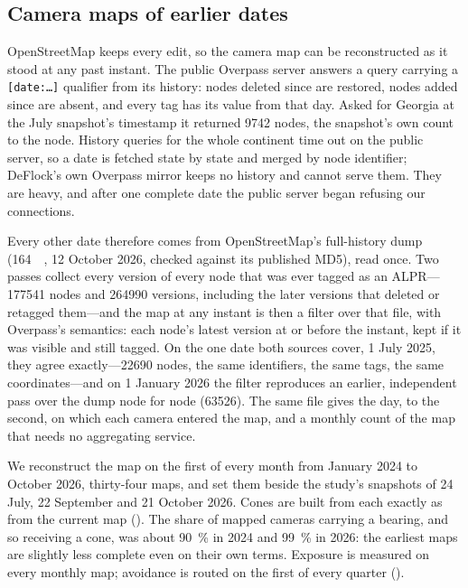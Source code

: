 \documentclass[11pt,twoside]{article}
\newcommand{\alpr}{ALPR\xspace}
\begin{document}
\subsection{Camera maps of earlier dates}
\label{sec:data:history}

OpenStreetMap keeps every edit, so the camera map can be reconstructed as it stood at any
past instant. The public Overpass server answers a query carrying a \texttt{[date:\ldots]}
qualifier from its history: nodes deleted since are restored, nodes added since are absent,
and every tag has its value from that day. Asked for Georgia at the July snapshot's
timestamp it returned \num{9742} nodes, the snapshot's own count to the node. History
queries for the whole continent time out on the public server, so a date is fetched state by
state and merged by node identifier; DeFlock's own Overpass mirror keeps no history and cannot
serve them. They are heavy, and after one complete date the public server began refusing our
connections.

Every other date therefore comes from OpenStreetMap's full-history dump \citep{osmplanet}
(\SI{164}{\giga\byte}, 12 October 2026, checked against its published MD5), read once. Two
passes collect every version of every node that was ever tagged as an \alpr---\num{177541}
nodes and \num{264990} versions, including the later versions that deleted or retagged
them---and the map at any instant is then a filter over that file, with Overpass's semantics:
each node's latest version at or before the instant, kept if it was visible and still tagged.
On the one date both sources cover, 1 July 2025, they agree exactly---\num{22690} nodes, the
same identifiers, the same tags, the same coordinates---and on 1 January 2026 the filter
reproduces an earlier, independent pass over the dump node for node (\num{63526}). The same
file gives the day, to the second, on which each camera entered the map, and a monthly count
of the map that needs no aggregating service.

We reconstruct the map on the first of every month from January 2024 to October 2026,
thirty-four maps, and set them beside the study's snapshots of 24 July, 22 September and
21 October 2026. Cones are built from each exactly as from the current map
(). The share
of mapped cameras carrying a bearing, and so receiving a cone, was about \SI{90}{\percent} in
2024 and \SI{99}{\percent} in 2026: the earliest maps are slightly less complete even on their
own terms. Exposure is measured on every monthly map; avoidance is routed on the first of every
quarter ().
\end{document}
